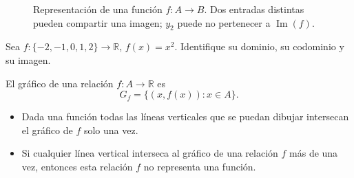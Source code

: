 \documentclass[10pt,a5paper]{article}
\newif\ifmostrarSoluciones
\begin{document}
\begin{figure}[H]
\centering
{}
\caption{Representación de una función $f:A\to B$. Dos entradas distintas pueden compartir una imagen; $y_2$ puede no pertenecer a $\operatorname{Im}(f)$.}
\label{fig:diagrama-funcion}
\end{figure}

\begin{ejemplo}
Sea $f:\{-2,-1,0,1,2\}\to\mathbb{R}$, $f(x)=x^2$. Identifique su dominio, su codominio y su imagen.
\end{ejemplo}
\ifmostrarSoluciones
\begin{solucion}
\[
\operatorname{Dom}(f)=\{-2,-1,0,1,2\},\qquad B=\mathbb{R}.
\]
Las salidas obtenidas son $4,1,0,1,4$, por lo que $\operatorname{Im}(f)=\{0,1,4\}$.
\end{solucion}
\else\vspace{12mm}\fi

\begin{definicion}[gráfica de $f$]
El gráfico de una relación $f:A\to\mathbb{R}$ es
\[
G_f=\{(x,f(x)):x\in A\}.
\]
\end{definicion}
\begin{proposicion}
\begin{itemize}
\item Dada una función todas las líneas verticales que se puedan dibujar intersecan el gráfico de $f$ solo una vez. 
\item Si cualquier línea vertical interseca al gráfico de una relación $f$ más de una vez, entonces esta relación $f$ no representa una función.
\end{itemize}
\end{proposicion}
\end{document}
